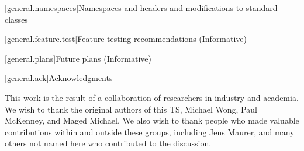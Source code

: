[general.namespaces]{Namespaces and headers and modifications to standard classes}

[general.feature.test]{Feature-testing recommendations (Informative)}

[general.plans]{Future plans (Informative)}

[general.ack]{Acknowledgments}

This work is the result of a collaboration of researchers in industry and academia. We wish to thank the
original authors of this TS, Michael Wong, Paul McKenney, and Maged Michael. We also wish to thank people
who made valuable contributions within and outside these groups, including Jens Maurer, and many others not named
here who contributed to the discussion.




